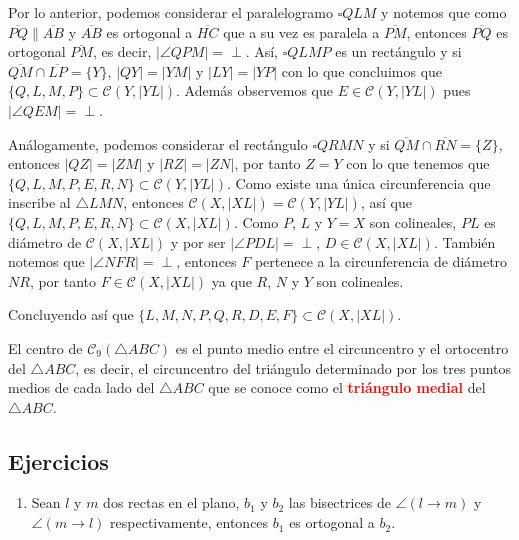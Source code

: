\begin{dem}
Por lo anterior, podemos considerar el paralelogramo $\square QLM$ y notemos que como $\overline{PQ}\parallel\overline{AB}$ y $\overline{AB}$ es ortogonal a $\overline{HC}$ que a su vez es paralela a $\overline{PM}$, entonces $\overline{PQ}$ es ortogonal $\overline{PM}$, es decir, $|\angle QPM|=\perp$. Así, $\square QLMP$ es un rectángulo y si $\overline{QM}\cap\overline{LP}=\{Y\}$, $|QY|=|YM|$ y $|LY|=|YP|$ con lo que concluimos que $\{Q,L,M,P\}\subset\mathcal{C}(Y,|YL|)$. Además observemos que $E\in\mathcal{C}(Y,|YL|)$ pues $|\angle QEM|=\perp$.

Análogamente, podemos considerar el rectángulo $\square QRMN$ y si $\overline{QM}\cap\overline{RN}=\{Z\}$, entonces $|QZ|=|ZM|$ y $|RZ|=|ZN|$, por tanto $Z=Y$ con lo que tenemos que $\{Q,L,M,P,E,R,N\}\subset\mathcal{C}(Y,|YL|)$. Como existe una única circunferencia que inscribe al $\triangle LMN$, entonces $\mathcal{C}(X,|XL|)=\mathcal{C}(Y,|YL|)$, así que $\{Q,L,M,P,E,R,N\}\subset\mathcal{C}(X,|XL|)$. Como $P$, $L$ y $Y=X$ son colineales, $PL$ es diámetro de $\mathcal{C}(X,|XL|)$ y por ser $|\angle PDL|=\perp$, $D\in\mathcal{C}(X,|XL|)$. También notemos que $|\angle NFR|=\perp$, entonces $F$ pertenece a la circunferencia de diámetro $NR$, por tanto $F\in\mathcal{C}(X,|XL|)$ ya que $R$, $N$ y $Y$ son colineales.

Concluyendo así que $\{L,M,N,P,Q,R,D,E,F\}\subset\mathcal{C}(X,|XL|)$.
\end{dem}

El centro de $\mathcal{C}_{9}(\triangle ABC)$ es el punto medio entre el circuncentro y el ortocentro del $\triangle ABC$, es decir, el circuncentro del triángulo determinado por los tres puntos medios de cada lado del $\triangle ABC$ que se conoce como el \textcolor{red}{\bf triángulo medial} del $\triangle ABC$. 


\subsection*{Ejercicios}
\begin{enumerate}
\item Sean $l$ y $m$ dos rectas en el plano, $b_{1}$ y $b_{2}$ las bisectrices de $\angle (l\longrightarrow m)$ y
$\angle (m\longrightarrow l)$ respectivamente, entonces $b_{1}$ es ortogonal a $b_{2}$.
\end{enumerate}

